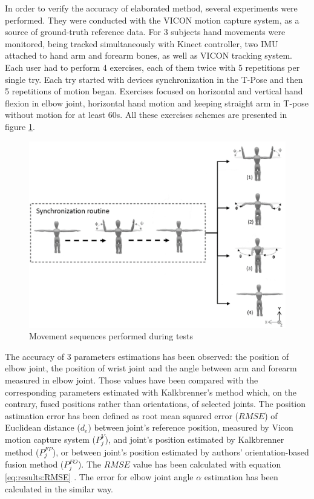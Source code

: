\documentclass[sensors,article,submit,moreauthors,pdftex,10pt,a4paper]{mdpi}
\begin{document}
In order to verify the accuracy of elaborated method, several experiments were performed. They were conducted with the VICON motion capture system, as a source of ground-truth reference data. For 3 subjects hand movements were monitored, being tracked simultaneously with Kinect controller, two IMU attached to hand arm and forearm bones, as well as VICON tracking system. Each user had to perform 4 exercises, each of them twice with 5 repetitions per single try. Each try started with devices synchronization in the T-Pose and then 5 repetitions of motion began. Exercises focused on horizontal and vertical hand flexion in elbow joint, horizontal hand motion and keeping straight arm in T-pose without motion for at least 60s. All these exercises schemes are presented in figure \ref{fig:results:sequences}.

\begin{figure}[H]
	\centering
	\includegraphics[width=12cm]{Figure8.png}
	\caption{Movement sequences performed during tests}
	\label{fig:results:sequences}
\end{figure}

The accuracy of 3 parameters estimations has been observed: the position of elbow joint, the position of wrist joint and the angle between arm and forearm measured in elbow joint. Those values have been compared with the corresponding parameters estimated with Kalkbrenner’s method \cite{Kalkbrenner2014} which, on the contrary, fused positions rather than orientations, of selected joints. The position astimation error has been defined as root mean squared error ($RMSE$) of Euclidean distance ($d_e$) between joint’s reference position, measured by Vicon motion capture system ($P_j^V$), and joint’s position estimated by Kalkbrenner method ($P_j^{FP}$), or between joint’s position estimated by authors’ orientation-based fusion method ($P_j^{FO}$). The $RMSE$ value has been calculated with equation \ref{eq:results:RMSE} \cite{Armstrong1992}. The error for elbow joint angle $\alpha$ estimation has been calculated in the similar way.
\end{document}
